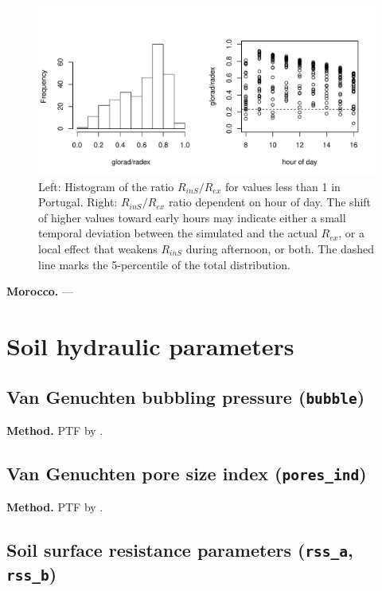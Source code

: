 \documentclass{scrreprt}
\begin{document}
\begin{figure}[H]
  \centering
  \includegraphics[width=0.9\hsize]{./fig/plot_radex.pdf}
  \caption{Left: Histogram of the ratio $R_{inS}/R_{ex}$ for values less than 1 in Portugal.
      Right: $R_{inS}/R_{ex}$ ratio dependent on hour of day.
      The shift of higher values toward early hours may indicate either a small temporal deviation between the simulated and the actual $R_{ex}$, or a local effect that weakens $R_{inS}$ during afternoon, or both.
      The dashed line marks the 5-percentile of the total distribution.}
  \label{fig:portugal_radex}
\end{figure}


\noindent
\textbf{Morocco.}
---

\newpage
\section{Soil hydraulic parameters} \label{sec:parest_soil}

\subsection{Van Genuchten bubbling pressure (\texttt{bubble})} \label{ssec:parest_soil_bubble}

\textbf{Method.}
PTF by \citet{rawls85}.

\newpage
\subsection{Van Genuchten pore size index (\texttt{pores\_ind})} \label{ssec:parest_soil_poresind}

\textbf{Method.}
PTF by \citet{rawls85}.

\newpage
\subsection{Soil surface resistance parameters (\texttt{rss\_a}, \texttt{rss\_b})} \label{ssec:parest_soil_rss}
\end{document}
